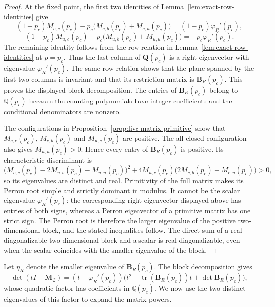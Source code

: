 \begin{proof}
At the fixed point, the first two identities of Lemma~\ref{lem:exact-row-identities} give
\[
 (1-p_c)M_{c,c}(p_c)
 -p_c\bigl(M_{c,b}(p_c)+M_{c,u}(p_c)\bigr)
 =(1-p_c)\varphi_R'(p_c),
\]
\[
 (1-p_c)M_{u,c}(p_c)
 -p_c\bigl(M_{u,b}(p_c)+M_{u,u}(p_c)\bigr)
 =-p_c\varphi_R'(p_c).
\]
The remaining identity follows from the row relation in Lemma~\ref{lem:exact-row-identities} at $p=p_c$.
Thus the last column of $\mathbf Q(p_c)$ is a right eigenvector with eigenvalue $\varphi_R'(p_c)$.
The same row relation shows that the plane spanned by the first two columns is invariant and that its restriction matrix is $\mathbf B_R(p_c)$.
This proves the displayed block decomposition.
The entries of $\mathbf B_R(p_c)$ belong to $\mathbb Q(p_c)$ because the counting polynomials have integer coefficients and the conditional denominators are nonzero.

The configurations in Proposition~\ref{prop:live-matrix-primitive} show that $M_{c,c}(p_c)$, $M_{c,b}(p_c)$ and $M_{u,c}(p_c)$ are positive.
The all-closed configuration also gives $M_{u,u}(p_c)>0$.
Hence every entry of $\mathbf B_R(p_c)$ is positive.
Its characteristic discriminant is
\[
 \bigl(M_{c,c}(p_c)-2M_{u,b}(p_c)-M_{u,u}(p_c)\bigr)^2
 +4M_{u,c}(p_c)\bigl(2M_{c,b}(p_c)+M_{c,u}(p_c)\bigr)>0,
\]
so its eigenvalues are distinct and real.
Primitivity of the full matrix makes its Perron root simple and strictly dominant in modulus.
It cannot be the scalar eigenvalue $\varphi_R'(p_c)$: the corresponding right eigenvector displayed above has entries of both signs, whereas a Perron eigenvector of a primitive matrix has one strict sign.
The Perron root is therefore the larger eigenvalue of the positive two-dimensional block, and the stated inequalities follow.
The direct sum of a real diagonalizable two-dimensional block and a scalar is real diagonalizable, even when the scalar coincides with the smaller eigenvalue of the block.
\end{proof}


Let $\eta_R$ denote the smaller eigenvalue of $\mathbf B_R(p_c)$.
The block decomposition gives
\[
 \det(tI-\mathbf M_{\mathfrak C})
 =(t-\varphi_R'(p_c))
 \bigl(t^2-\operatorname{tr}(\mathbf B_R(p_c))t+\det\mathbf B_R(p_c)\bigr),
\]
whose quadratic factor has coefficients in $\mathbb Q(p_c)$.
We now use the two distinct eigenvalues of this factor to expand the matrix powers.

